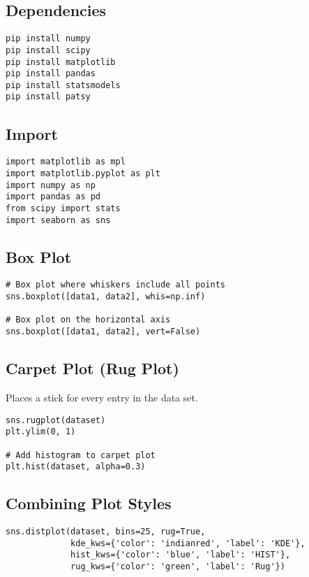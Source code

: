 \subsection{Dependencies}
\begin{lstlisting}
pip install numpy
pip install scipy
pip install matplotlib
pip install pandas
pip install statsmodels
pip install patsy
\end{lstlisting}

\subsection{Import}
\begin{lstlisting}
import matplotlib as mpl
import matplotlib.pyplot as plt
import numpy as np
import pandas as pd
from scipy import stats
import seaborn as sns
\end{lstlisting}

\subsection{Box Plot}

\begin{lstlisting}
# Box plot where whiskers include all points
sns.boxplot([data1, data2], whis=np.inf)

# Box plot on the horizontal axis
sns.boxplot([data1, data2], vert=False)
\end{lstlisting}

\subsection{Carpet Plot (Rug Plot)}
Places a stick for every entry in the data set.

\begin{lstlisting}
sns.rugplot(dataset)
plt.ylim(0, 1)

# Add histogram to carpet plot
plt.hist(dataset, alpha=0.3)
\end{lstlisting}

\subsection{Combining Plot Styles}

\begin{lstlisting}
sns.distplot(dataset, bins=25, rug=True,
             kde_kws={'color': 'indianred', 'label': 'KDE'},
             hist_kws={'color': 'blue', 'label': 'HIST'},
             rug_kws={'color': 'green', 'label': 'Rug'})
\end{lstlisting}

